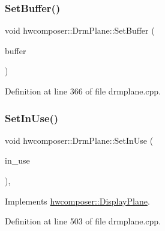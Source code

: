 \subsubsection{\texorpdfstring{Set\+Buffer()}{SetBuffer()}}
{\footnotesize\ttfamily void hwcomposer\+::\+Drm\+Plane\+::\+Set\+Buffer (\begin{DoxyParamCaption}\item[{std\+::shared\+\_\+ptr$<$ \mbox{\hyperlink{classhwcomposer_1_1OverlayBuffer}{Overlay\+Buffer}} $>$ \&}]{buffer }\end{DoxyParamCaption})}



Definition at line 366 of file drmplane.\+cpp.


\begin{DoxyCode}{0}
\end{DoxyCode}
\mbox{\label{classhwcomposer_1_1DrmPlane_aed0ac04d949d6457dd638e121c3618d5}} 
\subsubsection{\texorpdfstring{Set\+In\+Use()}{SetInUse()}}
{\footnotesize\ttfamily void hwcomposer\+::\+Drm\+Plane\+::\+Set\+In\+Use (\begin{DoxyParamCaption}\item[{bool}]{in\+\_\+use }\end{DoxyParamCaption})\hspace{0.3cm}{\ttfamily [override]}, {\ttfamily [virtual]}}



Implements \mbox{\hyperlink{classhwcomposer_1_1DisplayPlane_a6f74f9f29977ae00d534f2488505d7d7}{hwcomposer\+::\+Display\+Plane}}.



Definition at line 503 of file drmplane.\+cpp.


\begin{DoxyCode}{0}
\end{DoxyCode}
\mbox{\label{classhwcomposer_1_1DrmPlane_a8f904c14af7bfc4265640be4788d2096}} 
